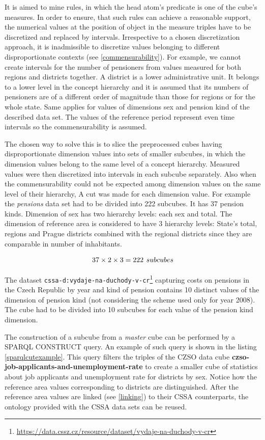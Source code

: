 It is aimed to mine rules, in which the head atom's predicate is one of the cube's measures. In order to ensure, that such rules can achieve a reasonable support, the numerical values at the position of object in the measure triples have to be discretized and replaced by intervals. Irrespective to a chosen discretization approach, it is inadmissible to discretize values belonging to different disproportionate contexts (see \ref{commensurability}). For example, we cannot create intervals for the number of pensioners from values measured for both regions and districts together. A district is a lower administrative unit. It belongs to a lower level in the concept hierarchy and it is assumed that its numbers of pensioners are of a different order of magnitude than those for regions or for the whole state. Same applies for values of dimensions sex and pension kind of the described data set. The values of the reference period represent even time intervals so the commensurability is assumed.

The chosen way to solve this is to slice the preprocessed cubes having disproportionate dimension values into sets of smaller subcubes, in which the dimension values belong to the same level of a concept hierarchy. Measured values were then discretized into intervals in each subcube separately. Also when the commensurability could not be expected among dimension values on the same level of their hierarchy, A cut was made for each dimension value. For example the \textit{pensions} data set had to be divided into 222 subcubes. It has 37 pension kinds. Dimension of sex has two hierarchy levels: each sex and total. The dimension of reference area is considered to have 3 hierarchy levels: State's total, regions and Prague districts combined with the regional districts since they are comparable in number of inhabitants.

$$
37 \times 2 \times 3 = 222\hspace{0.4em}subcubes
$$

The dataset \verb|cssa-d:vydaje-na-duchody-v-cr|\footnote{\href{https://data.cssz.cz/resource/dataset/vydaje-na-duchody-v-cr}{https://data.cssz.cz/resource/dataset/vydaje-na-duchody-v-cr}} capturing costs on pensions in the Czech Republic by year and kind of pension contains 10 distinct values of the dimension of pension kind (not considering the scheme used only for year 2008). The cube had to be divided into 10 subcubes for each value of the pension kind dimension.

The construction of a subcube from a \textit{master} cube can be performed by a SPARQL CONSTRUCT query. An example of such query is shown in the listing \ref{sparqlcutexample}. This query filters the triples of the CZSO data cube \textbf{czso-job-applicants-and-unemployment-rate} to create a smaller cube of statistics about job applicants and unemployment rate for districts by sex. Notice how the reference area values corresponding to districts are distinguished. After the reference area values are linked (see \ref{linking}) to their CSSA counterparts, the ontology provided with the CSSA data sets can be reused.

